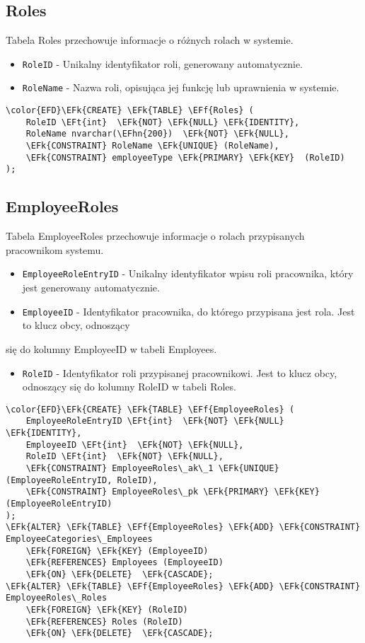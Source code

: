 \documentclass[11pt]{article}
\newcommand{\EFk}[1]{\textcolor{EFk}{\textbf{#1}}} %
\newcommand{\EFf}[1]{\textcolor{EFf}{#1}} %
\newcommand{\EFt}[1]{\textcolor{EFt}{\textbf{#1}}} %
\newcommand{\EFhn}[1]{\textcolor{EFhn}{#1}} %
\begin{document}
\subsection{Roles}
\label{sec:orgd97bc29}
Tabela Roles przechowuje informacje o różnych rolach w systemie.
\begin{itemize}
\item \texttt{RoleID} - Unikalny identyfikator roli, generowany automatycznie.
\item \texttt{RoleName} - Nazwa roli, opisująca jej funkcję lub uprawnienia w systemie.
\end{itemize}
\begin{Code}
\begin{Verbatim}
\color{EFD}\EFk{CREATE} \EFk{TABLE} \EFf{Roles} (
    RoleID \EFt{int}  \EFk{NOT} \EFk{NULL} \EFk{IDENTITY},
    RoleName nvarchar(\EFhn{200})  \EFk{NOT} \EFk{NULL},
    \EFk{CONSTRAINT} RoleName \EFk{UNIQUE} (RoleName),
    \EFk{CONSTRAINT} employeeType \EFk{PRIMARY} \EFk{KEY}  (RoleID)
);
\end{Verbatim}
\end{Code}
\subsection{EmployeeRoles}
\label{sec:org8090198}
Tabela EmployeeRoles przechowuje informacje o rolach przypisanych pracownikom systemu.
\begin{itemize}
\item \texttt{EmployeeRoleEntryID} - Unikalny identyfikator wpisu roli pracownika, który jest generowany automatycznie.
\item \texttt{EmployeeID} - Identyfikator pracownika, do którego przypisana jest rola. Jest to klucz obcy, odnoszący
\end{itemize}
się do kolumny EmployeeID w tabeli Employees.
\begin{itemize}
\item \texttt{RoleID} - Identyfikator roli przypisanej pracownikowi. Jest to klucz obcy, odnoszący się do kolumny RoleID w tabeli Roles.
\end{itemize}

\begin{Code}
\begin{Verbatim}
\color{EFD}\EFk{CREATE} \EFk{TABLE} \EFf{EmployeeRoles} (
    EmployeeRoleEntryID \EFt{int}  \EFk{NOT} \EFk{NULL} \EFk{IDENTITY},
    EmployeeID \EFt{int}  \EFk{NOT} \EFk{NULL},
    RoleID \EFt{int}  \EFk{NOT} \EFk{NULL},
    \EFk{CONSTRAINT} EmployeeRoles\_ak\_1 \EFk{UNIQUE} (EmployeeRoleEntryID, RoleID),
    \EFk{CONSTRAINT} EmployeeRoles\_pk \EFk{PRIMARY} \EFk{KEY}  (EmployeeRoleEntryID)
);
\EFk{ALTER} \EFk{TABLE} \EFf{EmployeeRoles} \EFk{ADD} \EFk{CONSTRAINT} EmployeeCategories\_Employees
    \EFk{FOREIGN} \EFk{KEY} (EmployeeID)
    \EFk{REFERENCES} Employees (EmployeeID)
    \EFk{ON} \EFk{DELETE}  \EFk{CASCADE};
\EFk{ALTER} \EFk{TABLE} \EFf{EmployeeRoles} \EFk{ADD} \EFk{CONSTRAINT} EmployeeRoles\_Roles
    \EFk{FOREIGN} \EFk{KEY} (RoleID)
    \EFk{REFERENCES} Roles (RoleID)
    \EFk{ON} \EFk{DELETE}  \EFk{CASCADE};
\end{Verbatim}
\end{Code}
\end{document}
